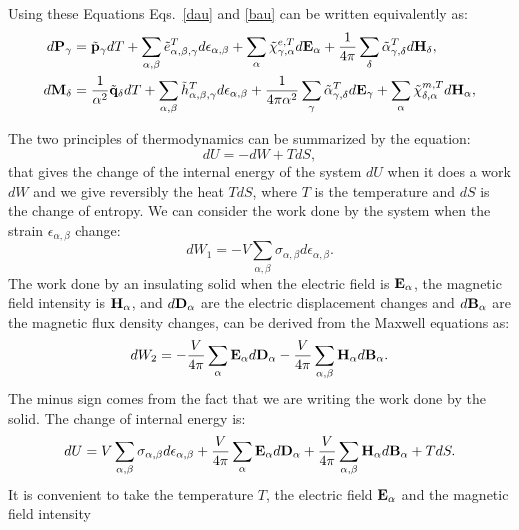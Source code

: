 \documentclass[12pt,a4paper,twoside]{report}
\begin{document}
{Using these Equations Eqs.~\ref{dau} and \ref{bau} can be written
equivalently as:
\begin{align}
d{\bf P}_\gamma&=
\tilde {\bf p}_\gamma dT + \sum_{\alpha,\beta} \tilde 
e^T_{\alpha,\beta,\gamma} d\epsilon_{\alpha,\beta}
+ \sum_\alpha \tilde \chi^{e,T}_{\gamma,\alpha} 
d{\bf E}_{\alpha} + {1\over 4 \pi}
\sum_\delta \tilde \alpha^T_{\gamma,\delta} d{\bf H}_{\delta}, \\
d{\bf M}_\delta&=
{1\over \alpha^2}\tilde {\bf q}_\delta dT+ \sum_{\alpha,\beta}
\tilde h^T_{\alpha,\beta,\gamma}
d\epsilon_{\alpha,\beta}
+{1\over 4 \pi \alpha^2} \sum_\gamma \tilde \alpha^T_{\gamma,\delta}
d{\bf E}_{\gamma}+ 
\sum_\alpha \tilde \chi^{m,T}_{\delta,\alpha}
d{\bf H}_{\alpha}, 
\end{align}
}

\newpage
{\color{orange}
The two principles of thermodynamics can be summarized by the equation:
\begin{equation}
dU = -dW + T dS,
\end{equation}
that gives the change of the internal energy of the system $dU$ when
it does a work $dW$ and we give reversibly the heat $T dS$, where $T$ 
is the temperature and $dS$ is the change of entropy.
We can consider the work done by the system when the strain
$\epsilon_{\alpha,\beta}$ change:
\begin{equation}
dW_1 =-V \sum_{\alpha,\beta} \sigma_{\alpha,\beta} d \epsilon_{\alpha,\beta}. 
\end{equation}
The work done by an insulating solid when the electric field is 
${\bf E}_\alpha$, the magnetic field intensity is ${\bf H}_\alpha$, 
and $d {\bf D}_\alpha$ are the electric displacement changes and 
$d {\bf B}_\alpha$ are the magnetic flux density changes, can be derived
from the Maxwell equations as: 
\begin{equation}
dW_2 = -{V \over 4 \pi} \sum_\alpha {\bf E}_\alpha d {\bf D}_\alpha 
-{V \over 4 \pi} \sum_{\alpha,\beta} {\bf H}_{\alpha} d {\bf B}_\alpha.
\end{equation}
The minus sign comes from the fact that we are writing the work done by the
solid. The change of internal energy is:
\begin{equation}
dU = V \sum_{\alpha,\beta} \sigma_{\alpha,\beta} d \epsilon_{\alpha,\beta}
+ {V \over 4 \pi} \sum_\alpha {\bf E}_\alpha d {\bf D}_\alpha + 
{V \over 4 \pi} \sum_{\alpha,\beta} {\bf H}_{\alpha} d {\bf B}_\alpha + T dS.
\end{equation}
It is convenient to take the temperature $T$,
the electric field ${\bf E}_\alpha$ and the magnetic field intensity
}
\end{document}
